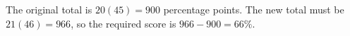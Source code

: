 The original total is $20(45)=900$ percentage points. The new total must be $21(46)=966$, so the required score is $966-900=\boxed{66\%}$.
